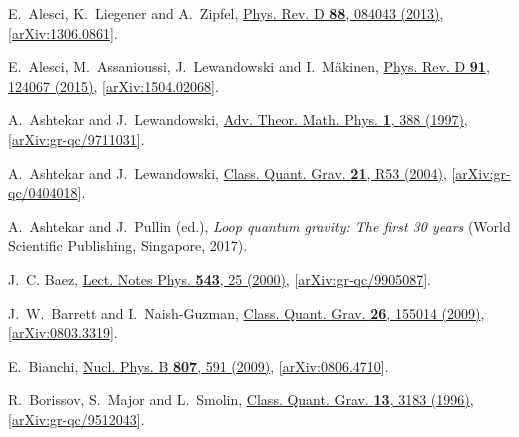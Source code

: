 \documentclass[graybox, secnum]{svmult}
\begin{document}
\begin{thebibliography}{99}
E.~Alesci, K.~Liegener and A.~Zipfel, %
  \href{http://dx.doi.org/10.1103/PhysRevD.88.084043}{Phys. Rev. D {\bfseries
  88}, 084043 (2013)},
  [\href{http://arxiv.org/abs/1306.0861}{arXiv:1306.0861}].

E.~Alesci, M.~Assanioussi, J.~Lewandowski and I.~M{\"a}kinen, %
  \href{http://dx.doi.org/10.1103/PhysRevD.91.124067}{Phys. Rev. D {\bfseries
  91}, 124067 (2015)},
  [\href{http://arxiv.org/abs/1504.02068}{arXiv:1504.02068}].

A.~Ashtekar and J.~Lewandowski, %
  \href{http://dx.doi.org/10.4310/ATMP.1997.v1.n2.a8}{Adv. Theor.
  Math. Phys. {\bfseries 1}, 388 (1997)},
  [\href{http://arxiv.org/abs/gr-qc/9711031}{arXiv:gr-qc/9711031}].

A.~Ashtekar and J.~Lewandowski,
  \href{http://dx.doi.org/10.1088/0264-9381/21/15/R01}{Class.
  Quant. Grav. {\bfseries 21}, R53 (2004)},
  [\href{http://arxiv.org/abs/gr-qc/0404018}{arXiv:gr-qc/0404018}].

  A.~Ashtekar and J.~Pullin (ed.),
  {\em Loop quantum gravity: The first 30 years}
  (World Scientific Publishing, Singapore, 2017).

J.~C. Baez, 
  \href{http://dx.doi.org/10.1007/3-540-46552-9_2}{Lect. Notes Phys.
  {\bfseries 543}, 25 (2000)},
  [\href{http://arxiv.org/abs/gr-qc/9905087}{arXiv:gr-qc/9905087}].

  J.~W.~Barrett and I.~Naish-Guzman, %
  \href{https://doi.org/10.1088/0264-9381/26/15/155014}{Class.
  Quant. Grav. {\bfseries 26}, 155014 (2009)},
  [\href{http://arxiv.org/abs/0803.3319}{arXiv:0803.3319}].
  
E.~Bianchi, %
  \href{http://dx.doi.org/10.1016/j.nuclphysb.2008.08.013}{Nucl. Phys. B
  {\bfseries 807}, 591 (2009)},
  [\href{http://arxiv.org/abs/0806.4710}{arXiv:0806.4710}].

R.~Borissov, S.~Major and L.~Smolin,
  \href{https://doi.org/10.1088/0264-9381/13/12/009}{Class. Quant. Grav.
  {\bfseries 13}, 3183 (1996)},
  [\href{http://arxiv.org/abs/gr-qc/9512043}{arXiv:gr-qc/9512043}].


\end{thebibliography}
\end{document}
